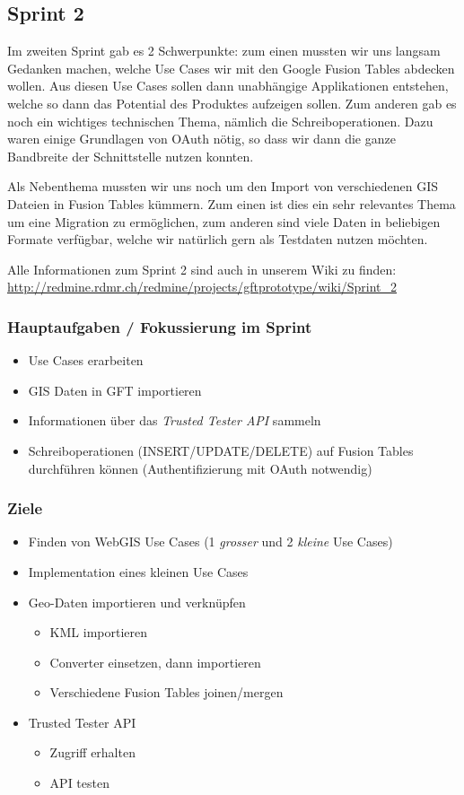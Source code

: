 \subsection{Sprint 2}

Im zweiten Sprint gab es 2 Schwerpunkte: zum einen mussten wir uns langsam Gedanken machen, welche Use Cases wir mit den Google Fusion Tables abdecken wollen. Aus diesen Use Cases sollen dann unabhängige Applikationen entstehen, welche so dann das Potential des Produktes aufzeigen sollen. Zum anderen gab es noch ein wichtiges technischen Thema, nämlich die Schreiboperationen. Dazu waren einige Grundlagen von OAuth nötig, so dass wir dann die ganze Bandbreite der Schnittstelle nutzen konnten.

Als Nebenthema mussten wir uns noch um den Import von verschiedenen GIS Dateien in Fusion Tables kümmern. Zum einen ist dies ein sehr relevantes Thema um eine Migration zu ermöglichen, zum anderen sind viele Daten in beliebigen Formate verfügbar, welche wir natürlich gern als Testdaten nutzen möchten.

Alle Informationen zum Sprint 2 sind auch in unserem Wiki zu finden:
\url{http://redmine.rdmr.ch/redmine/projects/gftprototype/wiki/Sprint_2}

\subsubsection{Hauptaufgaben / Fokussierung im Sprint}
\begin{itemize}
	\item Use Cases erarbeiten
	\item GIS Daten in GFT importieren
	\item Informationen über das \emph{Trusted Tester API} sammeln
	\item Schreiboperationen (INSERT/UPDATE/DELETE) auf Fusion Tables durchführen können (Authentifizierung mit OAuth notwendig)
\end{itemize}

\subsubsection{Ziele}
\begin{itemize}
	\item Finden von WebGIS Use Cases (1 \emph{grosser} und 2 \emph{kleine} Use Cases)
	\item Implementation eines kleinen Use Cases
	\item Geo-Daten importieren und verknüpfen
	\begin{itemize}
		\item KML importieren
		\item Converter einsetzen, dann importieren
		\item Verschiedene Fusion Tables joinen/mergen
	\end{itemize}
	\item Trusted Tester API
	\begin{itemize}
		\item Zugriff erhalten
		\item API testen
	\end{itemize}
\end{itemize}

